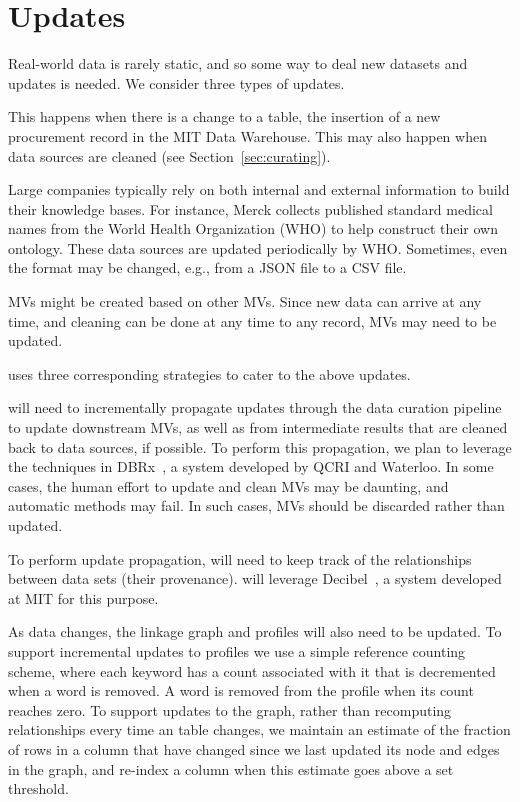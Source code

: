 \vspace{-.1em}
\section{Updates}
\label{sec:updates}

Real-world data is rarely static, and so some way to deal new datasets and updates is needed. We consider three types of updates.

 This happens when there is a
change to a table, \eg the insertion of a new procurement record in the MIT Data
Warehouse. This may also happen when data sources are cleaned (see
Section~\ref{sec:curating}).


 Large companies typically rely on
both internal and external information to build their knowledge bases. For
instance, Merck collects published standard medical names from the World Health
Organization (WHO) to help construct their own ontology. These data sources are
updated periodically by WHO.  Sometimes, even the format may be changed, e.g.,
from a JSON file to a CSV file.


 MVs might be created based on other MVs.  Since
new data can arrive at any time, and cleaning can be done at any time to any record, MVs may need to be
updated.


\dcv uses three corresponding strategies to cater to the above updates.

 \dcv will need to incrementally propagate updates through the data curation pipeline to update downstream MVs, as well as from intermediate results that are cleaned back to data sources, if possible.
To perform this propagation, we plan to leverage the techniques in DBRx~\cite{DBLP:conf/sigmod/ChalamallaIOP14}, a system developed by QCRI and Waterloo.
In some cases, the human effort to update and clean MVs may be daunting, and automatic methods may fail. In such cases, MVs should be discarded rather than updated. 

  To perform update propagation, \dcv will need to keep track of the relationships between data sets (their provenance). \dcv will leverage Decibel~\cite{DBLP:journals/pvldb/MaddoxGEMPD16}, a system developed at MIT for this purpose.

  As data changes, the linkage graph and profiles will also need to be updated.  To support incremental updates  to profiles we  use a simple reference counting scheme, where each keyword has a count associated with it that is decremented when a word is removed.  A word
is removed from the profile when its count reaches zero.  To support updates to the graph, rather than recomputing relationships every time an table changes, we 
maintain an estimate of the fraction of rows in a column that have changed since we last updated its node and edges in the graph, and re-index a column when
this estimate goes above a set threshold.


